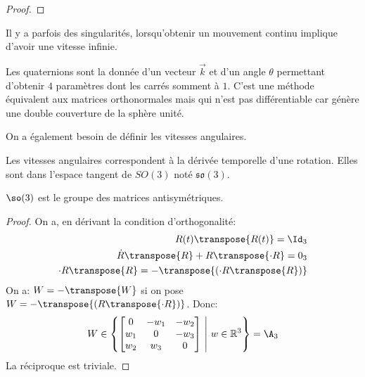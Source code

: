 \documentclass[math]{cours}
\begin{document}
\begin{proof}

\end{proof}

Il y a parfois des singularités, lorsqu'obtenir un mouvement continu implique d'avoir une vitesse infinie.

\begin{definition}
	Les quaternions sont la donnée d'un vecteur $\vec{k}$ et d'un angle $\theta$ permettant d'obtenir $4$ paramètres dont les carrés somment à $1$.
	C'est une méthode équivalent aux matrices orthonormales mais qui n'est pas différentiable car génère une double couverture de la sphère unité.
	\label{def:quaternions}
\end{definition}

On a également besoin de définir les vitesses angulaires.
\begin{definition}
	Les vitesses angulaires correspondent à la dérivée temporelle d'une rotation.
	Elles sont dans l'espace tangent de $SO(3)$ noté $\mathfrak{so}(3)$.
	\label{}
\end{definition}

\begin{thm}
	$\so(3)$ est le groupe des matrices antisymétriques.
	\label{prop:so3}
\end{thm}

\begin{proof}
	On a, en dérivant la condition d'orthogonalité:
	\begin{align*}
		R(t)\transpose{R(t)} = \Id_{3}\\
		\dot{R}\transpose{R} + R\transpose{\cdot{R}} = 0_{3}\\
		\cdot{R}\transpose{R} = -\transpose{\left(\cdot{R}\transpose{R}\right)}
	\end{align*}
	On a: $W = -\transpose{W}$ si on pose $W = -\transpose{\left(R\transpose{\cdot{R}}\right)}$.
	Donc:
	\begin{equation*}
		W \in \left\{ \begin{bmatrix}
				0 & -w_{1} & -w_{2}\\
				w_{1} & 0 & -w_{3}\\
				w_{2} & w_{3} & 0
		\end{bmatrix}\ \middle|\ w \in \R^{3}\right\} = \A_{3}
	\end{equation*}
	La réciproque est triviale.
\end{proof}
\end{document}
